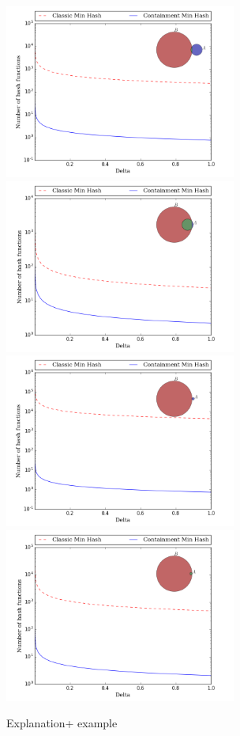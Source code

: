 \documentclass[11pt]{amsart}
\theoremstyle{remark}
\numberwithin{equation}{section}
\begin{document}
\begin{figure}[!h]%
\begin{center}
\includegraphics[width=3.0in,trim={0 0 0 0in},clip]{Figs/deltaK-1010.png}%
\hspace{1ex}
\includegraphics[width=3.0in,trim={0 0 0 0in},clip]{Figs/deltaK-1090.png}\\
\includegraphics[width=3.0in,trim={0 0 0 0in},clip]{Figs/deltaK-20010.png}%
\hspace{1ex}
\includegraphics[width=3.0in,trim={0 0 0 0in},clip]{Figs/deltaK-20090.png}
\end{center}
\caption{Explanation+ example }
\label{fig:DeltaK}%
\end{figure}
\end{document}
